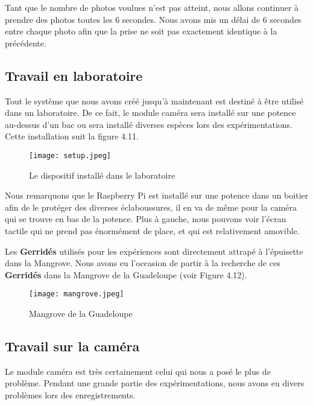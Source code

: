         \vspace{0.7cm}

        Tant que le nombre de photos voulues n'est pas atteint, nous allons continuer à prendre des photos toutes les 6 secondes. Nous avons mis un délai de 6 secondes entre chaque photo afin que la prise ne soit pas exactement identique à la précédente.
    
        \subsection{Travail en laboratoire}
        Tout le système que nous avons créé jusqu'à maintenant est destiné à être utilisé dans un laboratoire. De ce fait, le module caméra sera installé sur une potence au-dessus d'un bac ou sera installé diverses espèces lors des expérimentations. Cette installation suit la figure 4.11.

        \begin{figure}[ht]
            \centering
            \texttt{[image: setup.jpeg]} 
            \caption{Le dispositif installé dans le laboratoire}
        \end{figure} 

        Nous remarquons que le Raspberry Pi est installé sur une potence dans un boitier afin de le protéger des diverses éclaboussures, il en va de même pour la caméra qui se trouve en bas de la potence. Plus à gauche, nous pouvons voir l'écran tactile qui ne prend pas énormément de place, et qui est relativement amovible.

        \vspace{0.2cm}

        Les \textbf{Gerridés} utilisés pour les expériences sont directement attrapé à l'épuisette dans la Mangrove. Nous avons eu l'occasion de partir à la recherche de ces \textbf{Gerridés} dans la Mangrove de la Guadeloupe (voir Figure 4.12).

        \begin{figure}[ht]
            \centering
            \texttt{[image: mangrove.jpeg]}
            \caption{Mangrove de la Guadeloupe}
        \end{figure}

        \vspace{3.5cm}
             
        \subsection{Travail sur la caméra}
        Le module caméra est très certainement celui qui nous a posé le plus de problème. Pendant une grande partie des expérimentations, nous avons eu divers problèmes lors des enregistrements.

